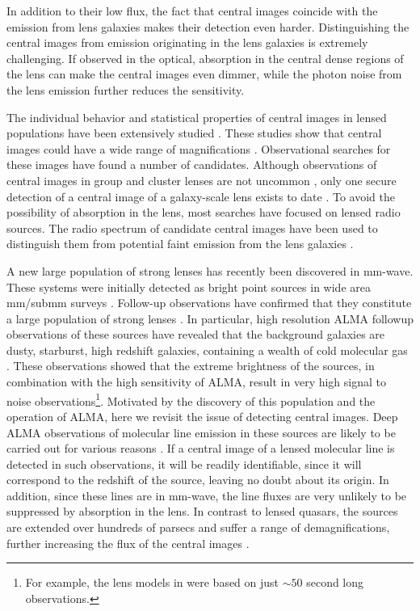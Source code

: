 \documentclass[chicago]{emulateapj}
\begin{document}
In addition to their low flux, the fact that central images coincide with the emission from lens galaxies makes their detection even harder. Distinguishing the central images from emission originating in the lens galaxies is extremely challenging.
If observed in the optical, absorption in the central dense regions of the lens can make the central images even dimmer, while the photon noise from the lens emission further reduces the sensitivity. 




The individual behavior and statistical properties of central images in lensed populations have been extensively studied \citep[e.g.,][]{Wallington:93, Evans:02, Keeton:03}. These studies show that central images could have a wide range of magnifications \citep[e.g.,][]{Keeton:03}. 
Observational searches for these images have found a number of candidates. Although observations
of central images in group and cluster lenses are not uncommon \citep[e.g.,][]{Inada:08}, only one secure detection of a central image of a galaxy-scale lens exists to date \citep{Winn:04}. To avoid the possibility of absorption in the lens, most searches have focused on lensed radio sources. The radio spectrum of candidate central images have been used to distinguish them from potential faint emission from the lens galaxies \citep[e.g.,][]{Zhang:07}.

A new large population of strong lenses has recently been discovered in mm-wave. These systems were initially detected as bright point sources in wide area mm/submm surveys \citep{vieira:10,negrello:10}. Follow-up observations have confirmed that they constitute a large population of strong lenses \citep{vieira:13, hezaveh:13b, bussmann:13}.
In particular, high resolution ALMA followup observations of these sources have revealed that the background galaxies are dusty, starburst, high redshift galaxies, containing a wealth of cold molecular gas \citep{Weiss:13}.  These observations showed that the extreme brightness of the sources, in combination with the high sensitivity of ALMA, result in very high signal to noise observations\footnote{For example, the lens models in \citet{hezaveh:13b} were based on just $\sim50$ second long observations.}.
Motivated by the discovery of this population and the operation of ALMA, here we revisit the issue of detecting central images.
Deep ALMA observations of molecular line emission in these sources are likely to be carried out for various reasons \citep[e.g.,][]{hezaveh:14a,hezaveh:14b}. If a central image of a lensed molecular line is detected in such observations, it will be readily identifiable, since it will correspond to the redshift of the source, leaving no doubt about its origin. In addition, since these lines are in mm-wave, the line fluxes are very unlikely to be suppressed by absorption in the lens. 
In contrast to lensed quasars, the sources are extended over hundreds of parsecs and suffer a range of demagnifications, further increasing the flux of the central images \citep[analogous to magnification damping of highly magnified images due to finite source effects, see e.g.,][]{hezaveh:11}.
\end{document}

